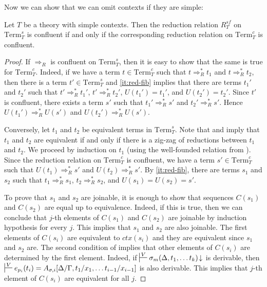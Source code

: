 \documentclass[reqno]{amsart}
\theoremstyle{definition}
\theoremstyle{remark}
\newcommand{\Term}{\mathrm{Term}}
\newcommand{\ctx}{\mathit{ctx}}
\numberwithin{figure}{section}
\begin{document}
Now we can show that we can omit contexts if they are simple:
\begin{prop}
Let $T$ be a theory with simple contexts.
Then the reduction relation $R^{sf}_T$ on $\Term_T^s$ is confluent if and only if the corresponding reduction relation on $\Term_T^c$ is confluent.
\end{prop}
\begin{proof}
If $\Rightarrow_R$ is confluent on $\Term_T^s$, then it is easy to show that the same is true for $\Term_T^c$.
Indeed, if we have a term $t \in \Term_T^c$ such that $t \Rightarrow_R^* t_1$ and $t \Rightarrow_R^* t_2$,
then there is a term $t' \in \Term_T^s$ and \eqref{it:red-fib} implies that there are terms $t_1'$ and $t_2'$ such that $t' \Rightarrow_R^* t_1'$, $t' \Rightarrow_R^* t_2'$, $U(t_1') = t_1'$, and $U(t_2') = t_2'$.
Since $t'$ is confluent, there exists a term $s'$ such that $t_1' \Rightarrow_R^* s'$ and $t_2' \Rightarrow_R^* s'$.
Hence $U(t_1') \Rightarrow_R^* U(s')$ and $U(t_2') \Rightarrow_R^* U(s')$.

Conversely, let $t_1$ and $t_2$ be equivalent terms in $\Term_T^s$.
Note that  and  imply that $t_1$ and $t_2$ are equivalent if and only if there is a zig-zag of reductions between $t_1$ and $t_2$.
We proceed by induction on $t_1$ (using the well-founded relation from ).
Since the reduction relation on $\Term_T^c$ is confluent, we have a term $s' \in \Term_T^c$ such that $U(t_1) \Rightarrow_R^* s'$ and $U(t_2) \Rightarrow_R^* s'$.
By \eqref{it:red-fib}, there are terms $s_1$ and $s_2$ such that $t_1 \Rightarrow_R^* s_1$, $t_2 \Rightarrow_R^* s_2$, and $U(s_1) = U(s_2) = s'$.

To prove that $s_1$ and $s_2$ are joinable, it is enough to show that sequences $C(s_1)$ and $C(s_2)$ are equal up to equivalence.
Indeed, if this is true, then we can conclude that $j$-th elements of $C(s_1)$ and $C(s_2)$ are joinable by induction hypothesis for every $j$.
This implies that $s_1$ and $s_2$ are also joinable.
The first elements of $C(s_i)$ are equivalent to $\ctx(s_i)$ and they are equivalent since $s_1$ and $s_2$ are.
The second condition of  implies that other elements of $C(s_i)$ are determined by the first element.
Indeed, if $\sststile{}{V} \sigma_m(\Delta, t_1, \ldots t_k)\!\downarrow$ is derivable, then $\sststile{}{V} e_{p_i}(t_i) = A_{\sigma,i}[\Delta/\Gamma, t_1/x_1, \ldots t_{i-1}/x_{i-1}]$ is also derivable.
This implies that $j$-th element of $C(s_i)$ are equivalent for all $j$.
\end{proof}
\end{document}
